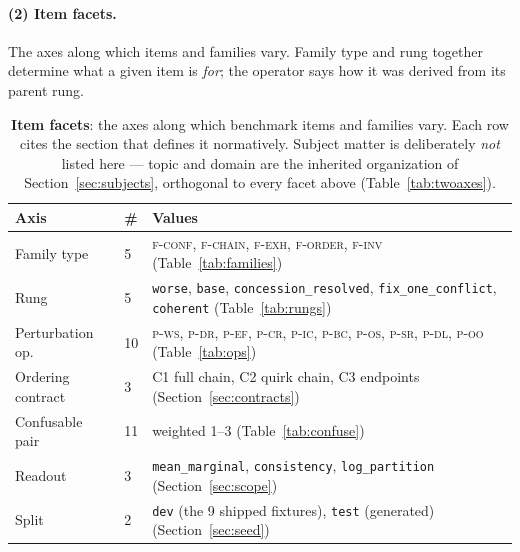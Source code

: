 \documentclass[11pt]{article}
\newcommand{\readout}[1]{\texttt{#1}}
\begin{document}
\paragraph{(2) Item facets.}
The axes along which items and families vary. Family type and rung together determine what a
given item is \emph{for}; the operator says how it was derived from its parent rung.

\begin{table}[!ht]\centering\small
\renewcommand{\arraystretch}{1.1}
\begin{tabular}{@{}llp{7.3cm}@{}}
\toprule
\textbf{Axis} & \textbf{\#} & \textbf{Values}\\
\midrule
Family type      & 5 & \textsc{f-conf}, \textsc{f-chain}, \textsc{f-exh}, \textsc{f-order},
                       \textsc{f-inv} \hfill(Table~\ref{tab:families})\\
Rung             & 5 & \texttt{worse}, \texttt{base}, \texttt{concession\_resolved},
                       \texttt{fix\_one\_conflict}, \texttt{coherent}
                       \hfill(Table~\ref{tab:rungs})\\
Perturbation op. & 10 & \textsc{p-ws}, \textsc{p-dr}, \textsc{p-ef}, \textsc{p-cr},
                        \textsc{p-ic}, \textsc{p-bc}, \textsc{p-os}, \textsc{p-sr},
                        \textsc{p-dl}, \textsc{p-oo} \hfill(Table~\ref{tab:ops})\\
Ordering contract & 3 & C1 full chain, C2 quirk chain, C3 endpoints
                        \hfill(Section~\ref{sec:contracts})\\
Confusable pair  & 11 & weighted 1--3 \hfill(Table~\ref{tab:confuse})\\
Readout          & 3 & \readout{mean\_marginal}, \readout{consistency},
                       \readout{log\_partition} \hfill(Section~\ref{sec:scope})\\
Split            & 2 & \texttt{dev} (the 9 shipped fixtures), \texttt{test} (generated)
                       \hfill(Section~\ref{sec:seed})\\
\bottomrule
\end{tabular}
\caption{\textbf{Item facets}: the axes along which benchmark items and families vary. Each
row cites the section that defines it normatively. Subject matter is deliberately \emph{not}
listed here --- topic and domain are the inherited organization of
Section~\ref{sec:subjects}, orthogonal to every facet above (Table~\ref{tab:twoaxes}).}
\label{tab:facetitem}
\end{table}
\end{document}
